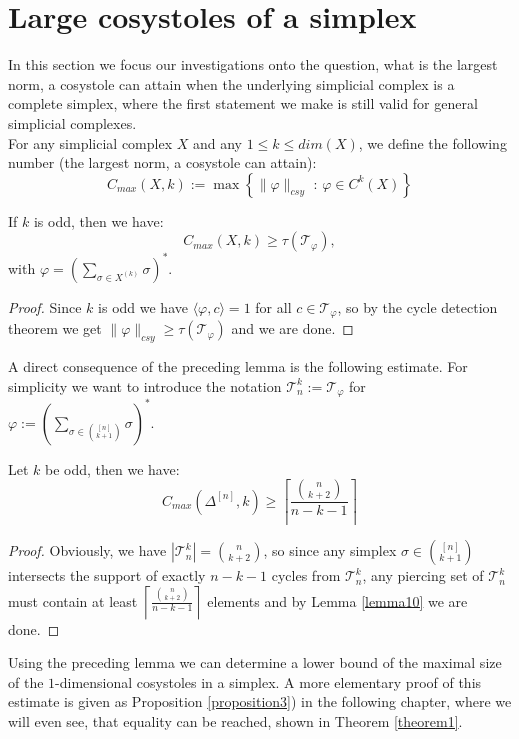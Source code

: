\section{Large cosystoles of a simplex}

In this section we focus our investigations onto the question, what is the largest norm, a cosystole can attain when the underlying simplicial complex is a complete simplex, where the first statement we make is still valid for general simplicial complexes.\\
For any simplicial complex \(X\) and any \(1\leq k\leq dim(X)\), we define the following number (the largest norm, a cosystole can attain):
\[
C_{max}(X,k):=\max\left\{\|\varphi\|_{csy}\text{ : }\varphi\in C^k(X)\right\}
\]

\begin{lem}\label{lemma10}
If \(k\) is odd, then we have:
\[
C_{max}(X,k)\geq\tau(\mathcal{T}_{\varphi}),
\]
with \(\varphi=\left(\sum\limits_{\sigma\in X^{(k)}}\sigma\right)^*\).
\begin{proof}
Since \(k\) is odd we have \(\langle\varphi,c\rangle=1\) for all \(c\in\mathcal{T}_{\varphi}\), so by the cycle detection theorem we get \(\|\varphi\|_{csy}\geq\tau(\mathcal{T}_{\varphi})\) and we are done.
\end{proof}
\end{lem}

A direct consequence of the preceding lemma is the following estimate. For simplicity we want to introduce the notation \(\mathcal{T}_n^k:=\mathcal{T}_{\varphi}\) for \(\varphi:=\left(\sum\limits_{\sigma\in\binom{[n]}{k+1}}\sigma\right)^*\).

\begin{prop}\label{proposition11}
Let \(k\) be odd, then we have:
\[
C_{max}(\Delta^{[n]},k)\geq \left\lceil\frac{\binom{n}{k+2}}{n-k-1}\right\rceil
\]
\begin{proof}
Obviously, we have \(|\mathcal{T}_n^k|=\binom{n}{k+2}\), so since any simplex \(\sigma\in\binom{[n]}{k+1}\) intersects the support of exactly \(n-k-1\) cycles from \(\mathcal{T}_n^k\), any piercing set of \(\mathcal{T}_n^k\) must contain at least \(\left\lceil\frac{\binom{n}{k+2}}{n-k-1}\right\rceil\) elements and by Lemma \ref{lemma10} we are done.
\end{proof}
\end{prop}

Using the preceding lemma we can determine a lower bound of the maximal size of the \(1\)-dimensional cosystoles in a simplex. A more elementary proof of this estimate is given as Proposition \ref{proposition3}) in the following chapter, where we will even see, that equality can be reached, shown in Theorem \ref{theorem1}.

